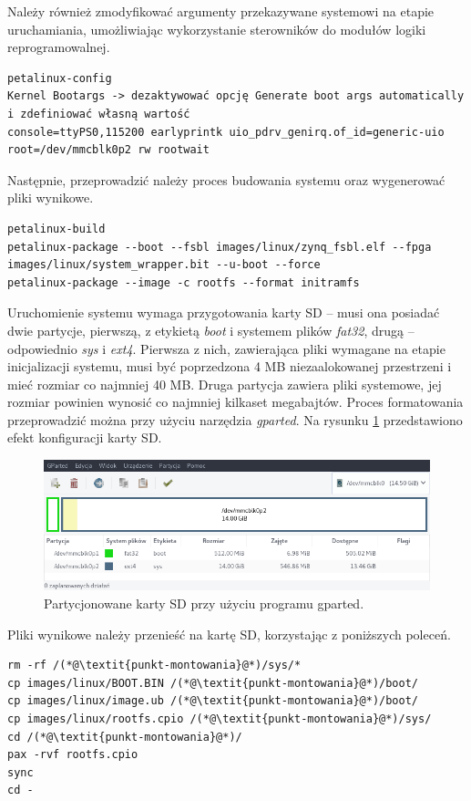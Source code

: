 Należy również zmodyfikować argumenty przekazywane systemowi na etapie uruchamiania, umożliwiając wykorzystanie sterowników do modułów logiki reprogramowalnej.

\begin{lstlisting}[breaklines=true]
petalinux-config
Kernel Bootargs -> dezaktywować opcję Generate boot args automatically i zdefiniować własną wartość
console=ttyPS0,115200 earlyprintk uio_pdrv_genirq.of_id=generic-uio root=/dev/mmcblk0p2 rw rootwait 
\end{lstlisting}
Następnie, przeprowadzić należy proces budowania systemu oraz wygenerować pliki wynikowe.

\begin{lstlisting}[breaklines=true]
petalinux-build
petalinux-package --boot --fsbl images/linux/zynq_fsbl.elf --fpga images/linux/system_wrapper.bit --u-boot --force
petalinux-package --image -c rootfs --format initramfs
\end{lstlisting}

Uruchomienie systemu wymaga przygotowania karty SD -- musi ona posiadać dwie partycje, pierwszą, z etykietą \emph{boot} i systemem plików \emph{fat32}, drugą -- odpowiednio \emph{sys} i \emph{ext4}. 
Pierwsza z nich, zawierająca pliki wymagane na etapie inicjalizacji systemu, musi być poprzedzona 4 MB niezaalokowanej przestrzeni i mieć rozmiar co najmniej 40 MB. 
Druga partycja zawiera pliki systemowe, jej rozmiar powinien wynosić co najmniej kilkaset megabajtów. 
Proces formatowania przeprowadzić można przy użyciu narzędzia \emph{gparted}. Na rysunku \ref{fig:gparted-screen} przedstawiono efekt konfiguracji karty SD.

\begin{figure}[H]
	\centering
	\includegraphics[width=12cm]{img/gparted-screen.png}
	\caption{Partycjonowane karty SD przy użyciu programu gparted.}
	\label{fig:gparted-screen}
\end{figure}

Pliki wynikowe należy przenieść na kartę SD, korzystając z poniższych poleceń.

\begin{lstlisting}[breaklines=true]
rm -rf /(*@\textit{punkt-montowania}@*)/sys/*
cp images/linux/BOOT.BIN /(*@\textit{punkt-montowania}@*)/boot/
cp images/linux/image.ub /(*@\textit{punkt-montowania}@*)/boot/
cp images/linux/rootfs.cpio /(*@\textit{punkt-montowania}@*)/sys/
cd /(*@\textit{punkt-montowania}@*)/
pax -rvf rootfs.cpio
sync
cd -
\end{lstlisting}

